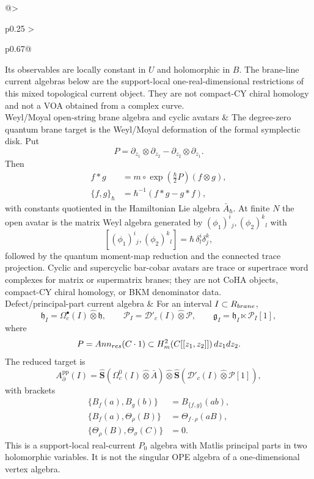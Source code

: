 \begin{longtable}{@{}>{\raggedright\arraybackslash}p{}
  >{\raggedright\arraybackslash}p{}@{}}
\[\]
Its observables are locally constant in \(U\) and holomorphic in \(B\).
The brane-line current algebras below are the support-local
one-real-dimensional restrictions of this mixed topological current
object.  They are not compact-CY chiral homology and not a VOA obtained
from a complex curve.\\
\hline
Weyl/Moyal open-string brane algebra and cyclic avatars &
The degree-zero quantum brane target is the Weyl/Moyal deformation of the
formal symplectic disk.  Put
\[
  P=\partial_{z_1}\otimes\partial_{z_2}
   -\partial_{z_2}\otimes\partial_{z_1}.
\]
Then
\[
  \begin{aligned}
  f*g&=m\circ\exp\!\left(\frac{\hbar}{2}P\right)(f\otimes g),\\
  \{f,g\}_\hbar&=\hbar^{-1}(f*g-g*f),
  \end{aligned}
\]
with constants quotiented in the Hamiltonian Lie algebra
\(\bar A_\hbar\).  At finite \(N\) the open avatar is the matrix Weyl
algebra generated by \((\phi_1)^i{}_j,(\phi_2)^k{}_l\) with
\[
  [(\phi_1)^i{}_j,(\phi_2)^k{}_l]
  =\hbar\,\delta^i_l\delta^k_j ,
\]
followed by the quantum moment-map reduction and the connected trace
projection.  Cyclic and supercyclic bar-cobar avatars are trace or
supertrace word complexes for matrix or supermatrix branes; they are not
CoHA objects, compact-CY chiral homology, or BKM denominator data.\\
\hline
Defect/principal-part current algebra &
For an interval \(I\subset R_{brane}\),
\[
  \mathfrak h_I=\Omega^\bullet_c(I)\widehat\otimes\mathfrak h,\qquad
  \mathcal P_I=\mathcal D'_c(I)\widehat\otimes\mathcal P,\qquad
  \mathfrak g_I=\mathfrak h_I\ltimes\mathcal P_I[1],
\]
where
\[
  P=Ann_{res}(C\cdot1)
  \subset H^2_{m}(C[[z_1,z_2]])\,dz_1dz_2 .
\]
The reduced target is
\[
  A^{\mathrm{pp}}_\partial(I)=
  \widehat{\mathbf S}(\Omega_c^0(I)\widehat\otimes\bar A)
  \widehat\otimes
  \widehat{\mathbf S}(\mathcal D'_c(I)\widehat\otimes\mathcal P[1]),
\]
with brackets
\[
  \begin{aligned}
  \{B_f(a),B_g(b)\}&=B_{\{f,g\}}(ab),\\
  \{B_f(a),\Theta_\rho(B)\}&=\Theta_{f\cdot\rho}(aB),\\
  \{\Theta_\rho(B),\Theta_\sigma(C)\}&=0 .
  \end{aligned}
\]
This is a support-local real-current \(P_0\) algebra with Matlis
principal parts in two holomorphic variables.  It is not the singular OPE
algebra of a one-dimensional vertex algebra.\\

\end{longtable}
